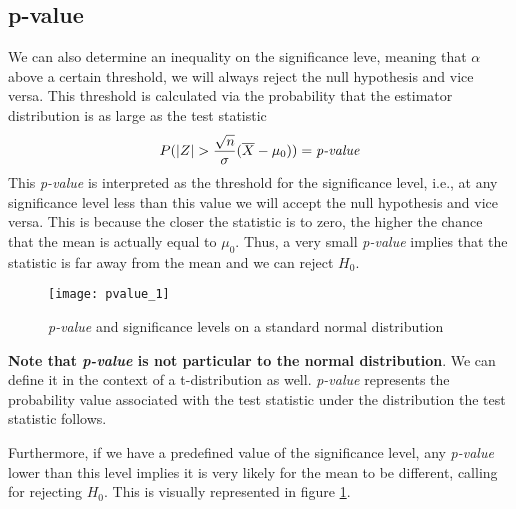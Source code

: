 \documentclass[../probability-notes.tex]{subfiles}
\begin{document}
    \subsection{p-value}\label{p_value}
    We can also determine an inequality on the significance leve, meaning that $\alpha$ above a certain threshold, we will always reject the null hypothesis and vice versa.\newline
    This threshold is calculated via the probability that the estimator distribution is as large as the test statistic
    \begin{align*}
        P(|Z| > \frac{\sqrt{n}}{\sigma}(\overline{X} - \mu_{0})) = \text{\emph{p-value}}
    \end{align*}
    This \emph{p-value} is interpreted as the threshold for the significance level, i.e., at any significance level less than this value we will accept the null hypothesis and vice versa. This is because the closer the statistic is to zero, the higher the chance that the mean is actually equal to $\mu_{0}$. Thus, a very small \emph{p-value} implies that the statistic is far away from the mean and we can reject $H_{0}$.\newline

    \begin{figure}[h]
    \texttt{[image: pvalue\_1]}
    \centering
    \caption{\emph{p-value} and significance levels on a standard normal distribution}
    \label{fig:pvalue_1} %
    \end{figure}

    \textbf{Note that \emph{p-value} is not particular to the normal distribution}. We can define it in the context of a t-distribution as well. \emph{p-value} represents the probability value associated with the test statistic under the distribution the test statistic follows.\newline  
    
    Furthermore, if we have a predefined value of the significance level, any \emph{p-value} lower than this level implies it is very likely for the mean to be different, calling for rejecting $H_{0}$. This is visually represented in figure \ref{fig:pvalue_1}.\newline
\end{document}
